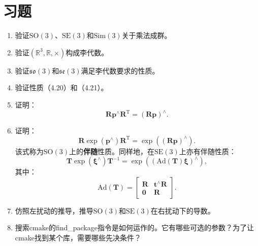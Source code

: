 \section*{习题}
\begin{enumerate}
	\item 验证$\mathrm{SO}(3)$、$\mathrm{SE}(3)$和$\mathrm{Sim}(3)$关于乘法成群。
	\item 验证$( \mathbb{R}^3, \mathbb{R}, \times )$构成李代数。
	\item 验证$\mathfrak{so}(3)$和$\mathfrak{se}(3)$满足李代数要求的性质。
	\item 验证性质（4.20）和（4.21）。
	\item 证明：\[
	\bm{R} \bm{p}^\wedge \bm{R}^\mathrm{T} = (\bm{Rp})^\wedge .\]
	\item 证明：\[
	\bm{R} \exp( \bm{p}^\wedge) \bm{R}^\mathrm{T} = \exp( (\bm{Rp})^\wedge ).\] 该式称为$\mathrm{SO}(3)$上的\textbf{伴随}性质。同样地，在$\mathrm{SE}(3)$上亦有伴随性质：
	\begin{equation}
	\bm{T} \exp(\boldsymbol{\xi}^\wedge)\bm{T}^{-1} = \exp \left( \left( \mathrm{Ad}(\bm{T}) \boldsymbol{\xi} \right) ^\wedge \right),
	\end{equation}
	其中：
	\begin{equation}
	\label{eq:adjSE3}
	\mathrm{Ad} ( \bm{T} ) = \left[ {\begin{array}{*{20}{c}}
		\bm{R} &{{ \bm{t} ^ \wedge } \bm{R} }\\
		\bm{0} & \bm{R}
		\end{array}} \right]. 
	\end{equation}
	\item 仿照左扰动的推导，推导$\mathrm{SO}(3)$和$\mathrm{SE}(3)$在右扰动下的导数。
	\item 搜索cmake的find\_package指令是如何运作的。它有哪些可选的参数？为了让cmake找到某个库，需要哪些先决条件？
\end{enumerate}
